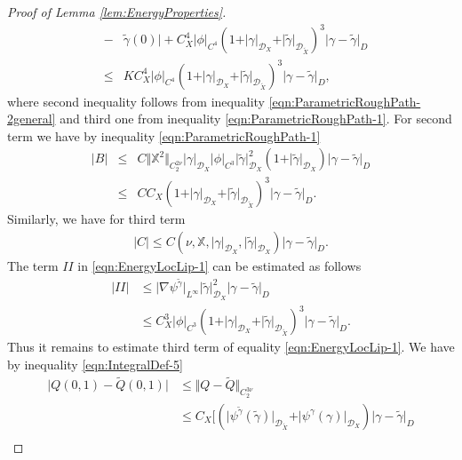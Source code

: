 \documentclass[11pt,a4paper,leqno]{amsart}%
\theoremstyle{plain}
\theoremstyle{remark}
\theoremstyle{plain}
\numberwithin{equation}{section}
\begin{document}
\begin{proof}[ Proof of Lemma \ref{lem:EnergyProperties}]
\begin{eqnarray}
&-&\tilde{\gamma}(0)\vert
+C_X^4\vert \phi\vert_{C^4}(1+\vert \gamma\vert_{\mathcal{D}_X}+\vert \tilde{\gamma}\vert_{\mathcal{D}_{\tilde{X}}})^3\vert \gamma-\tilde{\gamma}\vert_D
\nonumber\\
&\leq&
KC_X^4\vert \phi\vert_{C^4}(1+\vert \gamma\vert_{\mathcal{D}_X}+\vert \tilde{\gamma}\vert_{\mathcal{D}_{\tilde{X}}})^3\vert \gamma-\tilde{\gamma}\vert_{D},
\nonumber
\end{eqnarray}
where second inequality follows from inequality
\eqref{eqn:ParametricRoughPath-2general} and third one from
inequality \eqref{eqn:ParametricRoughPath-1}. For second term we
have by inequality \eqref{eqn:ParametricRoughPath-1}
\begin{eqnarray}
\vert B\vert &\leq&
C\Vert \mathbb{X}^2\Vert_{C_2^{2\nu}}\vert \gamma\vert_{\mathcal{D}_X}\vert \phi\vert_{C^3}\vert \tilde{\gamma}\vert_{\mathcal{D}_X}^2
(1+\vert \tilde{\gamma}\vert_{\mathcal{D}_X})\vert \gamma-\tilde{\gamma}\vert_{D}
\nonumber
\\
&\leq& CC_X(1+\vert \gamma\vert_{\mathcal{D}_X}+\vert \tilde{\gamma}\vert_{\mathcal{D}_{\tilde{X}}})^3\vert \gamma-\tilde{\gamma}\vert_D.
\label{eqn:EnergyLocLip-4}
\end{eqnarray}
Similarly, we have for third term
\begin{eqnarray}
\vert C\vert \leq
C(\nu,\mathbb{X},\vert \gamma\vert_{\mathcal{D}_X},\vert \tilde{\gamma}\vert_{\mathcal{D}_X})\vert \gamma-\tilde{\gamma}\vert_{D}.\label{eqn:EnergyLocLip-5}
\end{eqnarray}
The term $II$ in \eqref{eqn:EnergyLocLip-1} can be estimated as
follows
\begin{align*}
\vert II\vert &\leq
\vert \nabla\psi^{\tilde{\gamma}}\vert_{L^{\infty}}\vert \tilde{\gamma}\vert_{\mathcal{D}_X}^2\vert \gamma-\tilde{\gamma}\vert_D\\
&\leq
C_X^3\vert \phi\vert_{C^3}(1+\vert \gamma\vert_{\mathcal{D}_X}+\vert \tilde{\gamma}\vert_{\mathcal{D}_{\tilde{X}}})^3\vert \gamma-\tilde{\gamma}\vert_D.
\end{align*}
Thus it remains to estimate third term of equality
\eqref{eqn:EnergyLocLip-1}. We have by inequality
\eqref{eqn:IntegralDef-5}
\begin{align*}
\vert Q(0,1)-\tilde{Q}(0,1)\vert &\leq \Vert Q-\tilde{Q}\Vert_{C_2^{3\nu}}\\
&\leq
C_X\Big[(\vert \psi^{\tilde{\gamma}}(\tilde{\gamma})\vert_{\mathcal{D}_{\tilde{X}}}+
\vert \psi^{\gamma}(\gamma)\vert_{\mathcal{D}_X})\vert \gamma-\tilde{\gamma}\vert_D\\

\end{align*}
\end{proof}
\end{document}
